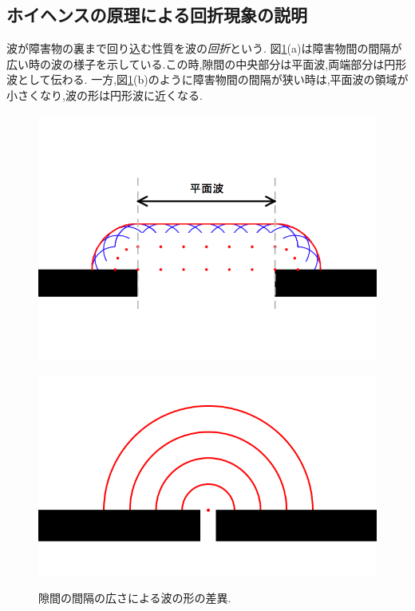 \subsection{ホイヘンスの原理による回折現象の説明}
波が障害物の裏まで回り込む性質を波の\emph{回折}という.
図\ref{fig:difraction}(a)は障害物間の間隔が広い時の波の様子を示している.この時,隙間の中央部分は平面波,両端部分は円形波として伝わる.
一方,図\ref{fig:difraction}(b)のように障害物間の間隔が狭い時は,平面波の領域が小さくなり,波の形は円形波に近くなる.
\begin{figure}[H]
\begin{minipage}[b]{1.0\linewidth}
\centering
  \includegraphics[keepaspectratio, scale=0.45]
  {../background/difraction2.png}
 \label{difraction1}
 \end{minipage}
  
  \begin{minipage}[b]{1.0\linewidth}
\centering
  \includegraphics[keepaspectratio, scale=0.45]
  {../background/difraction1.png}
 \label{difraction2}
 \end{minipage}
  
  \caption{隙間の間隔の広さによる波の形の差異.}
 \label{fig:difraction}
\end{figure}








